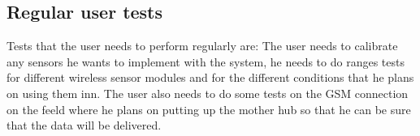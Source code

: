 \subsection{Regular user tests}
Tests that the user needs to perform regularly are: The user needs to calibrate any sensors he wants to implement with the system, he needs to do ranges tests for different wireless sensor modules and for the different conditions that he plans on using them inn. The user also needs to do some tests on the GSM connection on the feeld where he plans on putting up the mother hub so that he can be sure that the data will be delivered.

